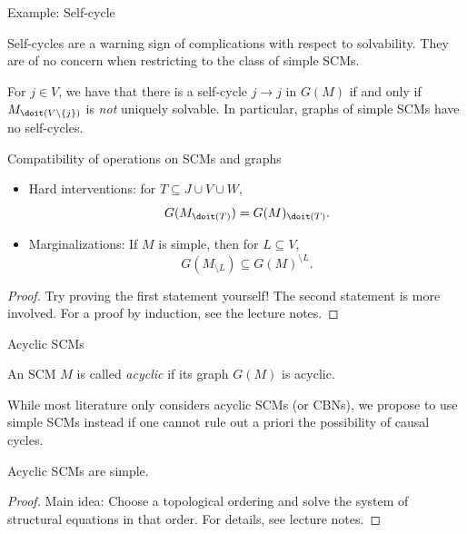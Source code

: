 \begin{frame}{Example: Self-cycle}
Self-cycles are a warning sign of complications with respect to solvability.
They are of no concern when restricting to the class of simple SCMs.
\begin{Prp}
  For $j \in V$, we have that there is a self-cycle $j \to j$ in $G(M)$ if and only if
  $M_{\doit(V\setminus \{j\})}$ is \emph{not} uniquely solvable.
  In particular, graphs of simple SCMs have no self-cycles.
\end{Prp}
\end{frame}

\begin{frame}{Compatibility of operations on SCMs and graphs}
  \begin{Prp}
  \begin{itemize}
    \item Hard interventions: for $T \subseteq J \cup V \cup W$,
      $$G(M_{\doit(T)}) = G(M)_{\doit(T)}.$$
    \item Marginalizations: If $M$ is simple, then for $L \subseteq V$,
      $$G(M_{\setminus L}) \subseteq G(M)^{\setminus L}.$$
  \end{itemize}
\end{Prp}
\begin{proof}
Try proving the first statement yourself!
The second statement is more involved. For a proof by induction, see the lecture notes.
\end{proof}
\end{frame}

\begin{frame}{Acyclic SCMs}
\begin{Def}
  An SCM $M$ is called \emph{acyclic} if its graph $G(M)$ is acyclic.
\end{Def}
  While most literature only considers acyclic SCMs (or CBNs), we propose to
  use simple SCMs instead if one cannot rule out a priori the possibility of causal cycles.
\begin{Prp}
  Acyclic SCMs are simple.
\end{Prp}
\begin{proof}
  Main idea: Choose a topological ordering and solve the system of structural equations in that order.
  For details, see lecture notes.
\end{proof}
\end{frame}
